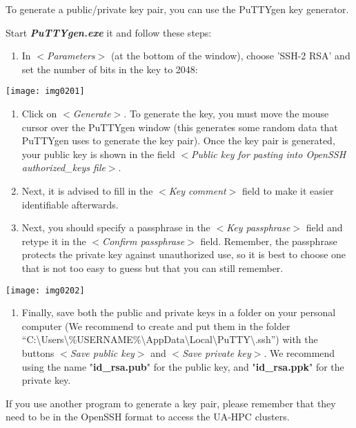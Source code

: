 {To generate a public/private key pair, you can use the PuTTYgen key generator.

Start \textbf{\textit{PuTTYgen.exe}} it and follow these steps:

\begin{enumerate}
\item  In $<$\textit{Parameters}$>$ (at the bottom of the window), choose 'SSH-2 RSA' and set the number of bits in the key to 2048:
\end{enumerate}

\texttt{[image: img0201]}

\begin{enumerate}
\item  Click on $<$\textit{Generate}$>$. To generate the key, you must move the mouse cursor over the PuTTYgen window (this generates some random data that PuTTYgen uses to generate the key pair). Once the key pair is generated, your public key is shown in the field $<$\textit{Public key for pasting into OpenSSH authorized\_keys file}$>$.
\item  Next, it is advised to fill in the $<$\textit{Key comment}$>$ field to make it easier identifiable afterwards.
\item  Next, you should specify a passphrase in the $<$\textit{Key passphrase}$>$ field and retype it in the $<$\textit{Confirm passphrase}$>$ field.  Remember, the passphrase protects the private key against unauthorized use, so it is best to choose one that is not too easy to guess but that you can still remember.
\end{enumerate}

\texttt{[image: img0202]}

\begin{enumerate}
\item  Finally, save both the public and private keys in a folder on your personal computer (We recommend to create and put them in the folder ``C:\textbackslash Users\textbackslash \%USERNAME\%\textbackslash AppData\textbackslash Local\textbackslash PuTTY\textbackslash .ssh'') with the buttons $<$\textit{Save public key}$>$ and $<$\textit{Save private key}$>$. We recommend using the name "\textbf{id\_rsa.pub}" for the public key, and "\textbf{id\_rsa.ppk}" for the private key.
\end{enumerate}

If you use another program to generate a key pair, please remember that they need to be in the OpenSSH format to access the UA-HPC clusters.
} %

